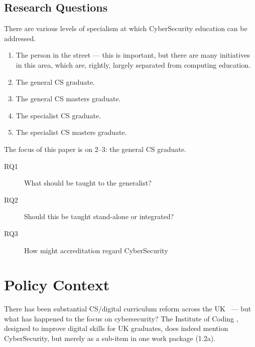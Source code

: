 \documentclass[sigconf,anonymous]{acmart}
\begin{document}
\subsection{Research Questions}
There are various levels of specialism at which CyberSecurity education can be addressed.
\begin{enumerate}
\item The person in the street --- this is important, but there are many initiatives in this area, which are, rightly, largely separated from computing education.
\item The general CS graduate.
\item The general CS masters graduate.
\item The specialist CS graduate.
\item The specialist CS masters graduate.
\end{enumerate}
The focus of this paper is on 2--3: the general CS graduate.
\begin{description}
\item[RQ1]What should be taught to the generalist?
\item[RQ2]Should this be taught stand-alone or integrated?
\item[RQ3]How might accreditation regard CyberSecurity
\end{description}
\section{Policy Context}

There has been substantial CS/digital curriculum reform across the
UK~\cite{crick+sentance:2011,brown-et-al:sigcse2013,wgictreview:2013,brown-et-al:toce2014,moller+crick:jce2018}
--- but what has happened to the focus on cybersecurity?  The Institute of Coding \cite{Davenportetal2019a}, designed to improve digital skills for UK graduates, does indeed mention CyberSecurity, but merely as a sub-item in one work package (1.2a).
\end{document}

